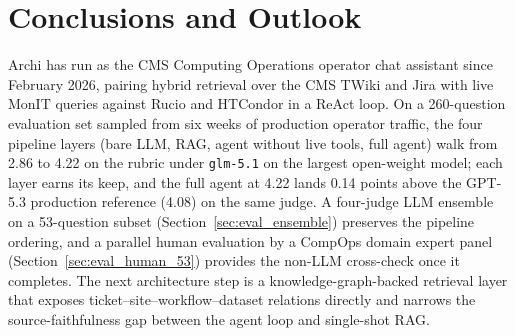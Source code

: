 \section{Conclusions and Outlook}
\label{sec:conclusions}

Archi has run as the CMS Computing Operations operator chat
assistant since February 2026, pairing hybrid retrieval over the
CMS TWiki and Jira with live MonIT queries against Rucio and
HTCondor in a ReAct loop. On a 260-question evaluation set
sampled from six weeks of production operator traffic, the four
pipeline layers (bare LLM, RAG, agent without live tools, full
agent) walk from 2.86 to 4.22 on the rubric under
\texttt{glm-5.1} on the largest open-weight model; each layer
earns its keep, and the full agent at 4.22 lands 0.14 points
above the GPT-5.3 production reference (4.08) on the same
judge. A four-judge LLM ensemble on a 53-question subset
(Section~\ref{sec:eval_ensemble}) preserves the pipeline
ordering, and a parallel human evaluation by a CompOps domain
expert panel (Section~\ref{sec:eval_human_53}) provides the
non-LLM cross-check once it completes. The next architecture step is a knowledge-graph-backed
retrieval layer that exposes ticket--site--workflow--dataset
relations directly and narrows the source-faithfulness gap
between the agent loop and single-shot RAG.
